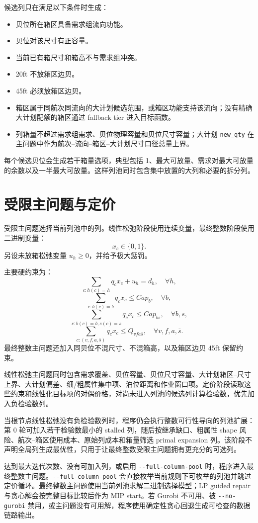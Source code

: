 \documentclass[UTF8,a4paper,11pt]{ctexart}
\newcommand{\code}[1]{\nolinkurl{#1}}
\begin{document}
候选列只在满足以下条件时生成：
\begin{itemize}
  \item 贝位所在箱区具备需求组流向功能。
  \item 贝位对该尺寸有正容量。
  \item 当前已有箱尺寸和箱高不与需求组冲突。
  \item 20ft 不放箱区边贝。
  \item 45ft 必须放箱区边贝。
  \item 箱区属于同航次同流向的大计划候选范围，或箱区功能支持该流向；没有精确大计划配额的箱区通过 fallback tier 进入目标函数。
  \item 列箱量不超过需求组需求、贝位物理容量和贝位尺寸容量；大计划 \code{new\_qty} 在主问题中作为航次--流向--箱区--大计划尺寸口径总量上界。
\end{itemize}

每个候选贝位会生成若干箱量选项，典型包括 1、最大可放量、需求对最大可放量的余数以及一半最大可放量。这样列池同时包含集中放置的大列和必要的拆分列。

\section{受限主问题与定价}

受限主问题选择当前列池中的列。线性松弛阶段使用连续变量，最终整数阶段使用二进制变量：
\[
x_c \in \{0,1\}.
\]
另设未放箱松弛变量 \(u_h\ge 0\)，并给予极大惩罚。

主要硬约束为：
\[
\sum_{c:h(c)=h} q_cx_c+u_h=d_h,\quad \forall h,
\]
\[
\sum_{c:b(c)=b} q_cx_c \le Cap_b,\quad \forall b,
\]
\[
\sum_{c:b(c)=b,s(c)=s} q_cx_c \le Cap_{bs},\quad \forall b,s,
\]
\[
\sum_{c:(v,f,a,\bar{s})} q_cx_c \le Q_{vfa\bar{s}},\quad \forall v,f,a,\bar{s}.
\]
最终整数主问题还加入同贝位不混尺寸、不混箱高，以及箱区边贝 45ft 保留约束。

线性松弛主问题同时包含需求覆盖、贝位容量、贝位尺寸容量、大计划箱区--尺寸上界、大计划偏差、细/粗属性集中项、泊位距离和作业窗口项。定价阶段读取这些约束和线性化目标项的对偶价格，对尚未进入列池的候选列计算检验数，优先加入负检验数列。

当根节点线性松弛没有负检验数列时，程序仍会执行整数可行性导向的列池扩展：第 0 轮可加入若干检验数最小的 stalled 列，随后按继承缺口、粗属性 shape 风险、航次--箱区使用成本、原始列成本和箱量筛选 primal expansion 列。该阶段不声明全局列生成最优性，只用于让最终整数受限主问题拥有更充分的可选列。

达到最大迭代次数、没有可加入列，或启用 \code{--full-column-pool} 时，程序进入最终整数主问题。\code{--full-column-pool} 会直接枚举当前规则下可枚举的列池并跳过定价循环。最终整数主问题使用当前列池求解二进制选择模型；LP guided repair 与贪心解会按完整目标比较后作为 MIP start。若 Gurobi 不可用、被 \code{--no-gurobi} 禁用，或主问题没有可用解，程序使用确定性贪心回退生成可检查的数据链路输出。
\end{document}
